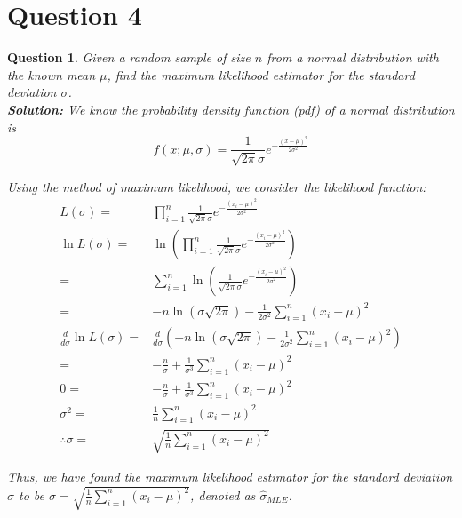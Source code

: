 \documentclass{article}
\theoremstyle{questionstyle}
\newtheorem{myquestion}{Question}
\begin{document}
\section{Question 4}
\begin{myquestion}
    Given a random sample of size \(n\) from a normal distribution with the known mean \(\mu\), find the maximum likelihood estimator for the standard deviation \(\sigma\).\\
  
    \textbf{Solution:}
    We know the probability density function (pdf) of a normal distribution is 
    \[ f(x; \mu, \sigma) = \frac{1}{\sqrt{2\pi}\sigma} e^{-\frac{(x-\mu)^2}{2\sigma^2}} \]

    Using the method of maximum likelihood, we consider the likelihood function:
    \begin{align*}
        L(\sigma) =& \prod_{i=1}^n \frac{1}{\sqrt{2\pi}\sigma} e^{-\frac{(x_i -\mu)^2}{2\sigma^2}}\\ 
        \ln L(\sigma) =& \ln\left(\prod_{i=1}^n \frac{1}{\sqrt{2\pi}\sigma} e^{-\frac{(x_i-\mu)^2}{2\sigma^2}} \right)\\
        =& \sum_{i=1}^n \ln\left(  \frac{1}{\sqrt{2\pi}\sigma} e^{-\frac{(x_i-\mu)^2}{2\sigma^2}} \right)\\
        =& -n \ln(\sigma\sqrt{2\pi}) - \frac{1}{2\sigma^2}\sum_{i=1}^n (x_i - \mu)^2 \\
        \frac{d}{d\sigma} \ln L(\sigma) =& \frac{d}{d\sigma} \left(  -n \ln(\sigma\sqrt{2\pi}) - \frac{1}{2\sigma^2}\sum_{i=1}^n (x_i - \mu)^2 \right)\\
        =& -\frac{n}{\sigma} + \frac{1}{\sigma^3}\sum_{i=1}^n (x_i - \mu)^2\\
        0 =& -\frac{n}{\sigma} + \frac{1}{\sigma^3}\sum_{i=1}^n (x_i - \mu)^2\\
        \sigma^2 =& \frac{1}{n} \sum_{i=1}^n (x_i - \mu)^2\\
        \therefore \sigma =& \sqrt{\frac{1}{n} \sum_{i=1}^n (x_i - \mu)^2}
    \end{align*}

    Thus, we have found the maximum likelihood estimator for the standard deviation \(\sigma\) to be \(\sigma = \sqrt{\frac{1}{n} \sum_{i=1}^n (x_i - \mu)^2}\), denoted as \(\hat{\sigma}_{MLE}\).
\end{myquestion}%
\end{document}
